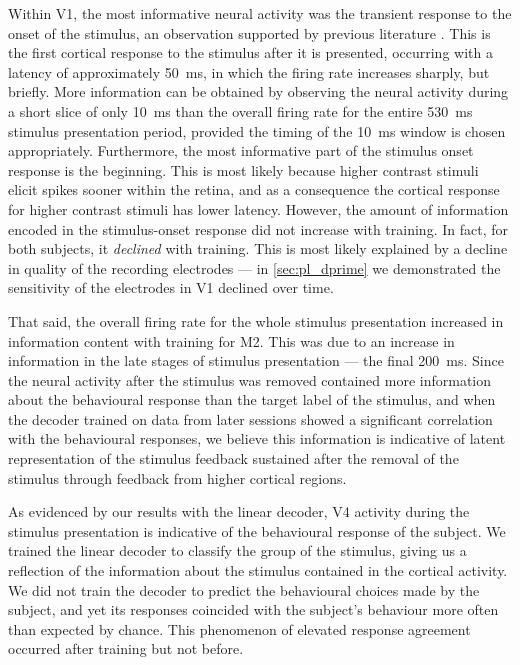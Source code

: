 Within \ac{V1}, the most informative neural activity was the transient response to the onset of the stimulus, an observation supported by previous literature \citep{Muller2001}.
This is the first cortical response to the stimulus after it is presented, occurring with a latency of approximately \SI{50}{\milli\second}, in which the firing rate increases sharply, but briefly.
More information can be obtained by observing the neural activity during a short slice of only \SI{10}{\milli\second} than the overall firing rate for the entire \SI{530}{\milli\second} stimulus presentation period, provided the timing of the \SI{10}{\milli\second} window is chosen appropriately.
Furthermore, the most informative part of the stimulus onset response is the beginning.
This is most likely because higher contrast stimuli elicit spikes sooner within the retina, and as a consequence the cortical response for higher contrast stimuli has lower latency.
However, the amount of information encoded in the stimulus-onset response did not increase with training.
In fact, for both subjects, it \textit{declined} with training.
This is most likely explained by a decline in quality of the recording electrodes --- in \autoref{sec:pl_dprime} we demonstrated the sensitivity of the electrodes in \ac{V1} declined over time.

That said, the overall firing rate for the whole stimulus presentation increased in information content with training for \ac{M2}.
This was due to an increase in information in the late stages of stimulus presentation --- the final \SI{200}{\milli\second}.
Since the neural activity after the stimulus was removed contained more information about the behavioural response than the target label of the stimulus, and when the decoder trained on data from later sessions showed a significant correlation with the behavioural responses, we believe this information is indicative of latent representation of the stimulus feedback sustained after the removal of the stimulus through feedback from higher cortical regions.

As evidenced by our results with the linear decoder, \ac{V4} activity during the stimulus presentation is indicative of the behavioural response of the subject.
We trained the linear decoder to classify the group of the stimulus, giving us a reflection of the information about the stimulus contained in the cortical activity.
We did not train the decoder to predict the behavioural choices made by the subject, and yet its responses coincided with the subject's behaviour more often than expected by chance.
This phenomenon of elevated response agreement occurred after training but not before.

